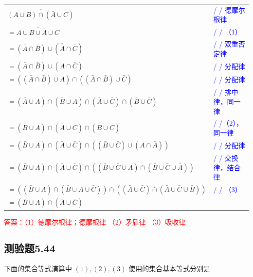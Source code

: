 \documentclass[UTF8, heading=true]{ctexart}
\begin{document}
\clearpage

\begin{table}[H]
  \centering
  \renewcommand{\arraystretch}{1.5}
  \begin{tabular}{ll}
    $\overline{(A \cup B) \cap (\bar{A} \cup C)}$ & \textcolor{blue}{/ / 德摩尔根律} \\
    $=\overline{A \cup B \cup \bar{A} \cup C}$ & \textcolor{blue}{/ / （1）} \\
    $=(\bar{A} \cap \bar{B}) \cup (\overline{\bar{A}} \cap \bar{C})$ & \textcolor{blue}{/ / 双重否定律} \\
    $=(\bar{A} \cap \bar{B}) \cup (A \cap \bar{C})$ & \textcolor{blue}{/ / 分配律} \\
    $=((\bar{A} \cap \bar{B}) \cup A) \cap ((\bar{A} \cap \bar{B}) \cup \bar{C})$ & \textcolor{blue}{/ / 分配律} \\
    $=(\bar{A} \cup A) \cap (\bar{B} \cup A) \cap (\bar{A} \cup \bar{C}) \cap (\bar{B} \cup \bar{C})$ & \textcolor{blue}{/ / 排中律，同一律} \\
    $=(\bar{B} \cup A) \cap (\bar{A} \cup \bar{C}) \cap (\bar{B} \cup \bar{C})$ & \textcolor{blue}{/ /（2），同一律} \\
    $=(\bar{B} \cup A) \cap (\bar{A} \cup \bar{C}) \cap ((\bar{B} \cup \bar{C}) \cup (A \cap \bar{A}))$ & \textcolor{blue}{/ / 分配律} \\
    $=(\bar{B} \cup A) \cap (\bar{A} \cup \bar{C}) \cap ((\bar{B} \cup \bar{C} \cup A) \cap (\bar{B} \cup \bar{C} \cup \bar{A}))$ & \textcolor{blue}{/ / 交换律，结合律} \\
    $=((\bar{B} \cup A) \cap (\bar{B} \cup A \cup \bar{C})) \cap ((\bar{A} \cup \bar{C}) \cap (\bar{A} \cup \bar{C} \cup \bar{B}))$ & \textcolor{blue}{/ / （3）} \\
    $=(\bar{B} \cup A) \cap (\bar{A} \cup \bar{C})$ & \\
  \end{tabular}
\end{table}

\textcolor{red}
{
  答案：（1）徳摩尔根律；德摩根律
  （2）矛盾律
  （3）吸收律
}

\subsection{测验题5.44}

下面的集合等式演算中 $(1),(2),(3)$ 使用的集合基本等式分别是
\end{document}
